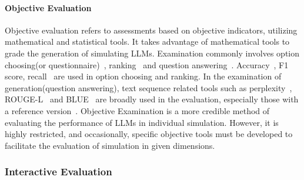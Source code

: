 \paragraph{Objective Evaluation}Objective evaluation refers to assessments based on objective indicators, utilizing mathematical and statistical tools. It takes advantage of mathematical tools to grade the generation of simulating LLMs. Examination commonly involves option choosing(or questionnaire)~\cite{karra2023estimatingpersonalitywhiteboxlanguage}, ranking~\cite{gao2023livechatlargescalepersonalizeddialogue} and question answering~\cite{jang2022customizedconversationcustomizedconversation}. Accuracy~\cite{xiang2023languagemodelsmeetworld,li2024steerabilitylargelanguagemodels}, F1 score, recall~\cite{branch2022evaluatingsusceptibilitypretrainedlanguage,ahn-etal-2023-mpchat} are used in option choosing and ranking. In the examination of generation(question answering), text sequence related tools such as perplexity~\cite{li2016personabasedneuralconversationmodel,cho2022personalizeddialoguegeneratorimplicit,agrawal-etal-2023-multimodal}, ROUGE-L~\cite{Liu_2022,chen2023largelanguagemodelsmeet,xiang2023languagemodelsmeetworld} and BLUE~\cite{li2016personabasedneuralconversationmodel,Liu_2022,branch2022evaluatingsusceptibilitypretrainedlanguage,gao2023livechatlargescalepersonalizeddialogue} are broadly used in the evaluation, especially those with a reference version~\cite{chen2023largelanguagemodelsmeet}. Objective Examination is a more credible method of evaluating the performance of LLMs in individual simulation. However, it is highly restricted, and occasionally, specific objective tools must be developed to facilitate the evaluation of simulation in given dimensions.

\subsubsection{Interactive Evaluation}

